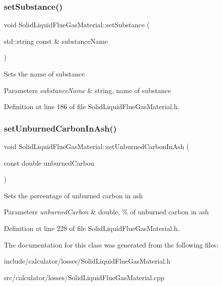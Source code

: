 \subsubsection{\texorpdfstring{set\+Substance()}{setSubstance()}}
{\footnotesize\ttfamily void Solid\+Liquid\+Flue\+Gas\+Material\+::set\+Substance (\begin{DoxyParamCaption}\item[{std\+::string const \&}]{substance\+Name }\end{DoxyParamCaption})\hspace{0.3cm}{\ttfamily [inline]}}

Sets the name of substance 
\begin{DoxyParams}{Parameters}
{\em substance\+Name} & string, name of substance \\
\hline
\end{DoxyParams}


Definition at line 186 of file Solid\+Liquid\+Flue\+Gas\+Material.\+h.

\mbox{\label{class_solid_liquid_flue_gas_material_adf052dd1bdceeab710a4986b1fd874b9}} 
\subsubsection{\texorpdfstring{set\+Unburned\+Carbon\+In\+Ash()}{setUnburnedCarbonInAsh()}}
{\footnotesize\ttfamily void Solid\+Liquid\+Flue\+Gas\+Material\+::set\+Unburned\+Carbon\+In\+Ash (\begin{DoxyParamCaption}\item[{const double}]{unburned\+Carbon }\end{DoxyParamCaption})\hspace{0.3cm}{\ttfamily [inline]}}

Sets the percentage of unburned carbon in ash 
\begin{DoxyParams}{Parameters}
{\em unburned\+Carbon} & double, \% of unburned carbon in ash \\
\hline
\end{DoxyParams}


Definition at line 228 of file Solid\+Liquid\+Flue\+Gas\+Material.\+h.



The documentation for this class was generated from the following files\+:\begin{DoxyCompactItemize}
\item 
include/calculator/losses/Solid\+Liquid\+Flue\+Gas\+Material.\+h\item 
src/calculator/losses/Solid\+Liquid\+Flue\+Gas\+Material.\+cpp\end{DoxyCompactItemize}

